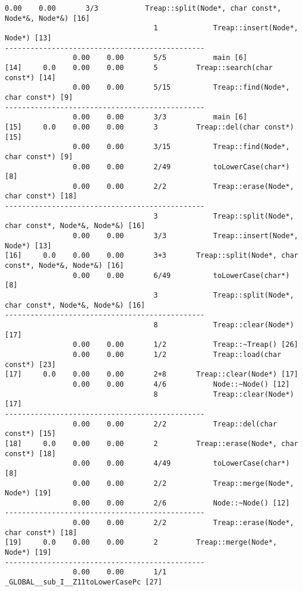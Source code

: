 \documentclass[12pt]{article}
\begin{document}
\begin{lstlisting}[breaklines]
                0.00    0.00       3/3           Treap::split(Node*, char const*, Node*&, Node*&) [16]
                                   1             Treap::insert(Node*, Node*) [13]
-----------------------------------------------
                0.00    0.00       5/5           main [6]
[14]     0.0    0.00    0.00       5         Treap::search(char const*) [14]
                0.00    0.00       5/15          Treap::find(Node*, char const*) [9]
-----------------------------------------------
                0.00    0.00       3/3           main [6]
[15]     0.0    0.00    0.00       3         Treap::del(char const*) [15]
                0.00    0.00       3/15          Treap::find(Node*, char const*) [9]
                0.00    0.00       2/49          toLowerCase(char*) [8]
                0.00    0.00       2/2           Treap::erase(Node*, char const*) [18]
-----------------------------------------------
                                   3             Treap::split(Node*, char const*, Node*&, Node*&) [16]
                0.00    0.00       3/3           Treap::insert(Node*, Node*) [13]
[16]     0.0    0.00    0.00       3+3       Treap::split(Node*, char const*, Node*&, Node*&) [16]
                0.00    0.00       6/49          toLowerCase(char*) [8]
                                   3             Treap::split(Node*, char const*, Node*&, Node*&) [16]
-----------------------------------------------
                                   8             Treap::clear(Node*) [17]
                0.00    0.00       1/2           Treap::~Treap() [26]
                0.00    0.00       1/2           Treap::load(char const*) [23]
[17]     0.0    0.00    0.00       2+8       Treap::clear(Node*) [17]
                0.00    0.00       4/6           Node::~Node() [12]
                                   8             Treap::clear(Node*) [17]
-----------------------------------------------
                0.00    0.00       2/2           Treap::del(char const*) [15]
[18]     0.0    0.00    0.00       2         Treap::erase(Node*, char const*) [18]
                0.00    0.00       4/49          toLowerCase(char*) [8]
                0.00    0.00       2/2           Treap::merge(Node*, Node*) [19]
                0.00    0.00       2/6           Node::~Node() [12]
-----------------------------------------------
                0.00    0.00       2/2           Treap::erase(Node*, char const*) [18]
[19]     0.0    0.00    0.00       2         Treap::merge(Node*, Node*) [19]
-----------------------------------------------
                0.00    0.00       1/1           _GLOBAL__sub_I__Z11toLowerCasePc [27]

\end{lstlisting}
\end{document}
